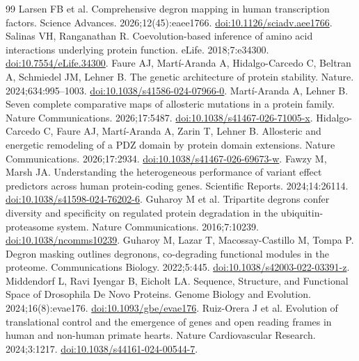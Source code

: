 \documentclass[11pt,a4paper]{article}
\begin{document}
\begin{thebibliography}{99}
 Larsen FB et al. Comprehensive degron mapping in human transcription factors. Science Advances. 2026;12(45):eaee1766. \href{https://doi.org/10.1126/sciadv.aee1766}{doi:10.1126/sciadv.aee1766}.
 Salinas VH, Ranganathan R. Coevolution-based inference of amino acid interactions underlying protein function. eLife. 2018;7:e34300. \href{https://doi.org/10.7554/eLife.34300}{doi:10.7554/eLife.34300}.
 Faure AJ, Mart\'{i}-Aranda A, Hidalgo-Carcedo C, Beltran A, Schmiedel JM, Lehner B. The genetic architecture of protein stability. Nature. 2024;634:995--1003. \href{https://doi.org/10.1038/s41586-024-07966-0}{doi:10.1038/s41586-024-07966-0}.
 Mart\'{i}-Aranda A, Lehner B. Seven complete comparative maps of allosteric mutations in a protein family. Nature Communications. 2026;17:5487. \href{https://doi.org/10.1038/s41467-026-71005-x}{doi:10.1038/s41467-026-71005-x}.
 Hidalgo-Carcedo C, Faure AJ, Mart\'{i}-Aranda A, Zarin T, Lehner B. Allosteric and energetic remodeling of a PDZ domain by protein domain extensions. Nature Communications. 2026;17:2934. \href{https://doi.org/10.1038/s41467-026-69673-w}{doi:10.1038/s41467-026-69673-w}.
 Fawzy M, Marsh JA. Understanding the heterogeneous performance of variant effect predictors across human protein-coding genes. Scientific Reports. 2024;14:26114. \href{https://doi.org/10.1038/s41598-024-76202-6}{doi:10.1038/s41598-024-76202-6}.
 Guharoy M et al. Tripartite degrons confer diversity and specificity on regulated protein degradation in the ubiquitin-proteasome system. Nature Communications. 2016;7:10239. \href{https://doi.org/10.1038/ncomms10239}{doi:10.1038/ncomms10239}.
 Guharoy M, Lazar T, Macossay-Castillo M, Tompa P. Degron masking outlines degronons, co-degrading functional modules in the proteome. Communications Biology. 2022;5:445. \href{https://doi.org/10.1038/s42003-022-03391-z}{doi:10.1038/s42003-022-03391-z}.
 Middendorf L, Ravi Iyengar B, Eicholt LA. Sequence, Structure, and Functional Space of Drosophila De Novo Proteins. Genome Biology and Evolution. 2024;16(8):evae176. \href{https://doi.org/10.1093/gbe/evae176}{doi:10.1093/gbe/evae176}.
 Ruiz-Orera J et al. Evolution of translational control and the emergence of genes and open reading frames in human and non-human primate hearts. Nature Cardiovascular Research. 2024;3:1217. \href{https://doi.org/10.1038/s44161-024-00544-7}{doi:10.1038/s44161-024-00544-7}.

\end{thebibliography}
\end{document}
